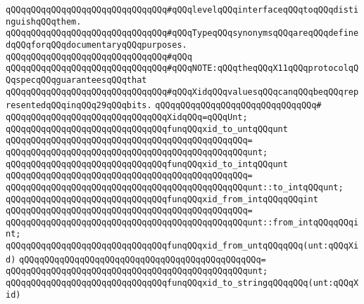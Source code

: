\verb|qQQqqQQqqQQqqQQqqQQqqQQqqQQqqQQq#qQQqlevelqQQqinterfaceqQQqtoqQQqdistinguishqQQqthem.|\newline
\verb|qQQqqQQqqQQqqQQqqQQqqQQqqQQqqQQq#qQQqTypeqQQqsynonymsqQQqareqQQqdefinedqQQqforqQQqdocumentaryqQQqpurposes.|\newline
\verb|qQQqqQQqqQQqqQQqqQQqqQQqqQQqqQQq#qQQq|\newline
\verb|qQQqqQQqqQQqqQQqqQQqqQQqqQQqqQQq#qQQqNOTE:qQQqtheqQQqX11qQQqprotocolqQQqspecqQQqguaranteesqQQqthat|\newline
\verb|qQQqqQQqqQQqqQQqqQQqqQQqqQQqqQQq#qQQqXidqQQqvaluesqQQqcanqQQqbeqQQqrepresentedqQQqinqQQq29qQQqbits.|\newline
\verb|qQQqqQQqqQQqqQQqqQQqqQQqqQQqqQQq#|\newline
\verb|qQQqqQQqqQQqqQQqqQQqqQQqqQQqqQQqXidqQQq=qQQqUnt;|\newline
\newline
\verb|qQQqqQQqqQQqqQQqqQQqqQQqqQQqqQQqfunqQQqxid_to_untqQQqunt|\newline
\verb|qQQqqQQqqQQqqQQqqQQqqQQqqQQqqQQqqQQqqQQqqQQqqQQq=|\newline
\verb|qQQqqQQqqQQqqQQqqQQqqQQqqQQqqQQqqQQqqQQqqQQqqQQqunt;|\newline
\newline
\verb|qQQqqQQqqQQqqQQqqQQqqQQqqQQqqQQqfunqQQqxid_to_intqQQqunt|\newline
\verb|qQQqqQQqqQQqqQQqqQQqqQQqqQQqqQQqqQQqqQQqqQQqqQQq=|\newline
\verb|qQQqqQQqqQQqqQQqqQQqqQQqqQQqqQQqqQQqqQQqqQQqqQQqunt::to_intqQQqunt;|\newline
\newline
\verb|qQQqqQQqqQQqqQQqqQQqqQQqqQQqqQQqfunqQQqxid_from_intqQQqqQQqint|\newline
\verb|qQQqqQQqqQQqqQQqqQQqqQQqqQQqqQQqqQQqqQQqqQQqqQQq=|\newline
\verb|qQQqqQQqqQQqqQQqqQQqqQQqqQQqqQQqqQQqqQQqqQQqqQQqunt::from_intqQQqqQQqint;|\newline
\newline
\verb|qQQqqQQqqQQqqQQqqQQqqQQqqQQqqQQqfunqQQqxid_from_untqQQqqQQq(unt:qQQqXid)|\newline
\verb|qQQqqQQqqQQqqQQqqQQqqQQqqQQqqQQqqQQqqQQqqQQqqQQq=|\newline
\verb|qQQqqQQqqQQqqQQqqQQqqQQqqQQqqQQqqQQqqQQqqQQqqQQqunt;|\newline
\newline
\verb|qQQqqQQqqQQqqQQqqQQqqQQqqQQqqQQqfunqQQqxid_to_stringqQQqqQQq(unt:qQQqXid)|\newline
